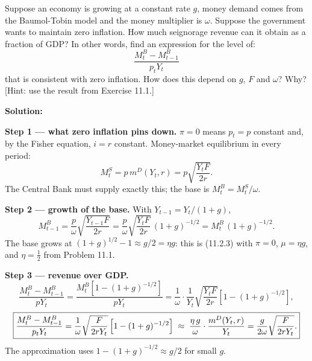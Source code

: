 \documentclass[12pt, letterpaper]{article}
\newcommand{\mD}{m^{D}}
\newcommand{\Ms}{M^{S}}
\newcommand{\MBase}{M^{B}}
\begin{document}
\begin{tcolorbox}[oddbox,title={Problem 11.3 \quad Seignorage with Zero Inflation and Growth}]
\begin{tcolorbox}[questionbox]
Suppose an economy is growing at a constant rate $g$, money demand comes from the Baumol-Tobin
model and the money multiplier is $\omega$. Suppose the government wants to maintain zero
inflation. How much seignorage revenue can it obtain as a fraction of GDP? In other words, find
an expression for the level of:
\[
\frac{\MBase_t-\MBase_{t-1}}{p_tY_t}
\]
that is consistent with zero inflation. How does this depend on $g$, $F$ and $\omega$? Why?
[Hint: use the result from Exercise 11.1.]
\end{tcolorbox}

\textbf{Solution:}

\textbf{Step 1 --- what zero inflation pins down.} $\pi=0$ means $p_t=p$ constant and, by the
Fisher equation, $i=r$ constant. Money-market equilibrium in every period:
\[
\Ms_t=p\,\mD(Y_t,r)=p\sqrt{\frac{Y_tF}{2r}} .
\]
The Central Bank must supply exactly this; the base is $\MBase_t=\Ms_t/\omega$.

\textbf{Step 2 --- growth of the base.} With $Y_{t-1}=Y_t/(1+g)$,
\[
\MBase_{t-1}=\frac{p}{\omega}\sqrt{\frac{Y_{t-1}F}{2r}}=\frac{p}{\omega}\sqrt{\frac{Y_tF}{2r}}\,(1+g)^{-1/2}
=\MBase_t\,(1+g)^{-1/2}.
\]
The base grows at $(1+g)^{1/2}-1\approx g/2=\eta g$: this is (11.2.3) with $\pi=0$, $\mu=\eta g$,
and $\eta=\tfrac12$ from Problem 11.1.

\textbf{Step 3 --- revenue over GDP.}
\[
\frac{\MBase_t-\MBase_{t-1}}{pY_t}
=\frac{\MBase_t\left[1-(1+g)^{-1/2}\right]}{pY_t}
=\frac{1}{\omega}\cdot\frac{1}{Y_t}\sqrt{\frac{Y_tF}{2r}}\left[1-(1+g)^{-1/2}\right],
\]
\[
\boxed{\frac{\MBase_t-\MBase_{t-1}}{p_tY_t}=\frac{1}{\omega}\sqrt{\frac{F}{2rY_t}}\,
\Bigl[1-(1+g)^{-1/2}\Bigr]
\;\approx\;\frac{\eta\,g}{\omega}\cdot\frac{\mD(Y_t,r)}{Y_t}
=\frac{g}{2\omega}\sqrt{\frac{F}{2rY_t}} .}
\]
The approximation uses $1-(1+g)^{-1/2}\approx g/2$ for small $g$.


\end{tcolorbox}
\end{document}
